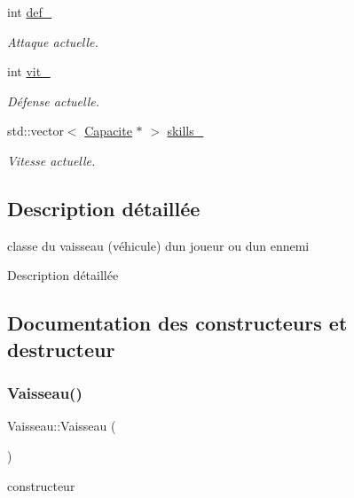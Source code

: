 \begin{DoxyCompactItemize}
int \hyperlink{class_vaisseau_abe1d646c91dcd6ad2d84a5d30ea2aeca}{def\+\_\+}
\begin{DoxyCompactList}\small\item\em Attaque actuelle. \end{DoxyCompactList}\item 
int \hyperlink{class_vaisseau_afab28349b10bc1d8c48888f84c4386dd}{vit\+\_\+}
\begin{DoxyCompactList}\small\item\em Défense actuelle. \end{DoxyCompactList}\item 
std\+::vector$<$ \hyperlink{class_capacite}{Capacite} $\ast$ $>$ \hyperlink{class_vaisseau_a7fccd409e1f27f968bbe3f8ee1ded206}{skills\+\_\+}
\begin{DoxyCompactList}\small\item\em Vitesse actuelle. \end{DoxyCompactList}\end{DoxyCompactItemize}


\subsection{Description détaillée}
classe du vaisseau (véhicule) d\textquotesingle{}un joueur ou d\textquotesingle{}un ennemi 

Description détaillée 

\subsection{Documentation des constructeurs et destructeur}
\mbox{\label{class_vaisseau_a86378a70f0d92fcc6c5c5973574b2b7d}} 
\subsubsection{\texorpdfstring{Vaisseau()}{Vaisseau()}}
{\footnotesize\ttfamily Vaisseau\+::\+Vaisseau (\begin{DoxyParamCaption}{ }\end{DoxyParamCaption})\hspace{0.3cm}{\ttfamily [explicit]}}



constructeur 

\mbox{\label{class_vaisseau_ae40b8e0143d6b736065207281bde2e8a}} 
